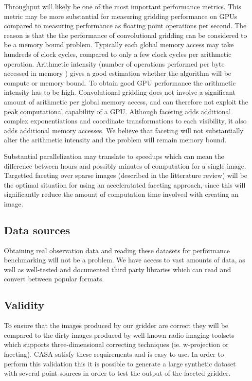 \documentclass[a4paper, two column]{article}
\begin{document}
Throughput will likely be one of the most important performance metrics. This metric may be more substantial for measuring gridding performance on GPUs compared to measuring performance 
as floating point operations per second. The reason is that the the performance of convolutional gridding can be considered to be a memory bound problem. Typically each global memory access may take hundreds of clock cycles, compared to only a few clock 
cycles per arithmetic operation. Arithmetic intensity (number of operations performed per byte accessed in memory \cite{sclocco2014auto}) gives a good estimation whether the algorithm will be compute or memory bound. To obtain good GPU performance 
the arithmetic intensity has to be high. Convolutional gridding does not involve a significant amount of arithmetic per global memory access, and can therefore not exploit the peak computational capability of a GPU. Although faceting adds additional complex 
exponentiations and coordinate transformations to each visibility, it also adds additional memory accesses. We believe that faceting will not substantially alter the arithmetic intensity and 
the problem will remain memory bound.

Substantial parallelization may translate to speedups which can mean the difference between hours and possibly minutes of computation for a single image. Targetted faceting over sparse images (described in the litterature review) will
be the optimal situation for using an acceleratated faceting approach, since this will significantly reduce the amount of computation time involved with creating an image. 
\subsection{Data sources}
Obtaining real observation data and reading these datasets for performance benchmarking will not be a problem. We have access to vast amounts of data, as well as well-tested and documented third party libraries which can read and convert between
popular formats.
\subsection{Validity}
 To ensure that the images produced by our gridder are correct they will be compared to the dirty images produced by well-known radio imaging toolsets which supports three-dimensional correcting techniques (ie. w-projection or faceting). CASA satisfy these requirements and is easy to use. In order 
 to perform this validation this it is possible to generate a large synthetic dataset with several point sources in order to test the output of the faceted gridder.
\end{document}
